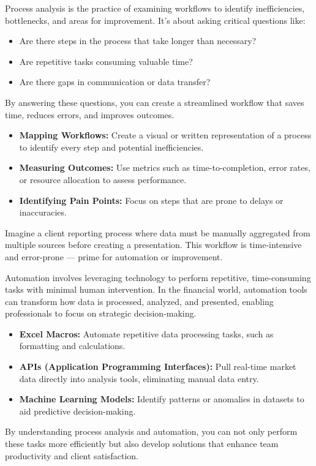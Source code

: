 \documentclass[11pt]{article}
\begin{document}
Process analysis is the practice of examining workflows to identify
inefficiencies, bottlenecks, and areas for improvement. It's about asking
critical questions like:
\begin{itemize}[leftmargin=1.5em, itemsep=2pt]
  \item Are there steps in the process that take longer than necessary?
  \item Are repetitive tasks consuming valuable time?
  \item Are there gaps in communication or data transfer?
\end{itemize}
By answering these questions, you can create a streamlined workflow that saves
time, reduces errors, and improves outcomes.

\begin{itemize}[leftmargin=1.5em, itemsep=2pt]
  \item \textbf{Mapping Workflows:} Create a visual or written representation
  of a process to identify every step and potential inefficiencies.
  \item \textbf{Measuring Outcomes:} Use metrics such as time-to-completion,
  error rates, or resource allocation to assess performance.
  \item \textbf{Identifying Pain Points:} Focus on steps that are prone to
  delays or inaccuracies.
\end{itemize}

Imagine a client reporting process where data must be manually aggregated from
multiple sources before creating a presentation. This workflow is
time-intensive and error-prone --- prime for automation or improvement.

Automation involves leveraging technology to perform repetitive,
time-consuming tasks with minimal human intervention. In the financial world,
automation tools can transform how data is processed, analyzed, and presented,
enabling professionals to focus on strategic decision-making.

\begin{itemize}[leftmargin=1.5em, itemsep=2pt]
  \item \textbf{Excel Macros:} Automate repetitive data processing tasks, such
  as formatting and calculations.
  \item \textbf{APIs (Application Programming Interfaces):} Pull real-time
  market data directly into analysis tools, eliminating manual data entry.
  \item \textbf{Machine Learning Models:} Identify patterns or anomalies in
  datasets to aid predictive decision-making.
\end{itemize}
By understanding process analysis and automation, you can not only perform
these tasks more efficiently but also develop solutions that enhance team
productivity and client satisfaction.
\end{document}
